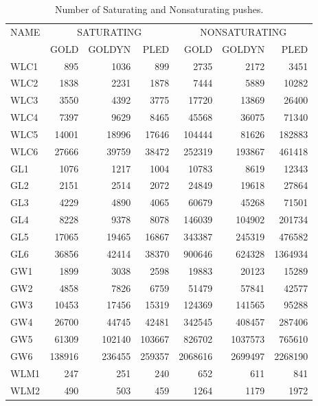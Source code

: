 \begin{table}[h]\begin{center}
\caption{Number of Saturating and Nonsaturating pushes.\label{Push.tbl}} 
\begin{tabular}{||l||r|r|r||r|r|r||}
\hline
NAME & \multicolumn{3}{c||}{SATURATING} &
\multicolumn{3}{c||}{NONSATURATING}\\
\cline{2-7}
 & GOLD & GOLDYN & PLED & GOLD & GOLDYN & PLED \\
\hline
WLC1 &   895 &   1036 &    899 &    2735 &    2172 &   3451\\
WLC2 &  1838 &   2231 &   1878 &    7444 &    5889 &  10282\\
WLC3 &  3550 &   4392 &   3775 &   17720 &   13869 &  26400\\
WLC4 &  7397 &   9629 &   8465 &   45568 &   36075 &  71340\\
WLC5 & 14001 &  18996 &  17646 &  104444 &   81626 & 182883\\
WLC6 & 27666 &  39759 &  38472 &  252319 &  193867 & 461418\\
\hline
 GL1 &  1076 &   1217 &   1004 &   10783 &    8619 &  12343\\
 GL2 &  2151 &   2514 &   2072 &   24849 &   19618 &  27864\\
 GL3 &  4229 &   4890 &   4065 &   60679 &   45268 &  71501\\
 GL4 &  8228 &   9378 &   8078 &  146039 &  104902 & 201734\\
 GL5 & 17065 &  19465 &  16867 &  343387 &  245319 & 476582\\
 GL6 & 36856 &  42414 &  38370 &  900646 &  624328 &1364934\\
\hline
 GW1 &  1899 &   3038 &   2598 &   19883 &   20123 &  15289\\
 GW2 &  4858 &   7826 &   6759 &   51479 &   57841 &  42577\\
 GW3 & 10453 &  17456 &  15319 &  124369 &  141565 &  95288\\
 GW4 & 26700 &  44745 &  42481 &  342545 &  408457 & 287406\\
 GW5 & 61309 & 102140 & 103667 &  826702 & 1037573 & 765610\\
 GW6 &138916 & 236455 & 259357 & 2068616 & 2699497 &2268190\\
\hline
WLM1 &   247 &    251 &    240 &     652 &     611 &    841\\
WLM2 &   490 &    503 &    459 &    1264 &    1179 &   1972\\

\end{tabular}
\end{center}
\end{table}
